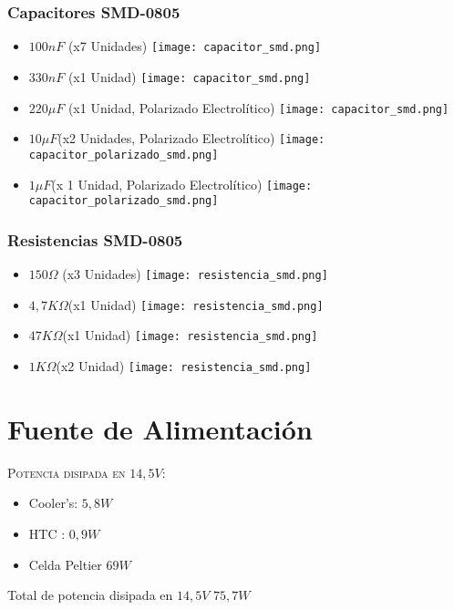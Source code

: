 \documentclass[a4paper]{article}
\numberwithin{equation}{section}
\numberwithin{figure}{section}
\begin{document}
\begin{itemize}
\subsubsection {Capacitores SMD-0805}
\begin{itemize}
\item $100nF$ (x7 Unidades)
\texttt{[image: capacitor\_smd.png]}	
\item $330nF$ (x1 Unidad)
\texttt{[image: capacitor\_smd.png]}	
\item $220\mu F$ (x1 Unidad, Polarizado Electrolítico)
\texttt{[image: capacitor\_smd.png]}	
\item $10\mu F$(x2 Unidades, Polarizado Electrolítico)
\texttt{[image: capacitor\_polarizado\_smd.png]}	
\item $1 \mu F$(x 1 Unidad, Polarizado Electrolítico)
\texttt{[image: capacitor\_polarizado\_smd.png]}	
\end{itemize}
\subsubsection {Resistencias SMD-0805}
\begin{itemize}
\item $150\Omega$ (x3 Unidades)
\texttt{[image: resistencia\_smd.png]}	
\item $4,7K\Omega$(x1 Unidad)
\texttt{[image: resistencia\_smd.png]}	
\item $47K\Omega$(x1 Unidad)
\texttt{[image: resistencia\_smd.png]}	
\item $1K\Omega$(x2 Unidad)
\texttt{[image: resistencia\_smd.png]}	
\end{itemize}
\end{itemize}

\pagebreak

\section {Fuente de Alimentación}

\textsc{\Large Potencia disipada en $14,5V$:}

\begin{itemize}
\item Cooler's: $5,8 W$
\item HTC : $0,9 W$
\item Celda Peltier $69 W$
\end{itemize}
Total de potencia disipada en $14,5V$ $75,7W$
\end{document}
